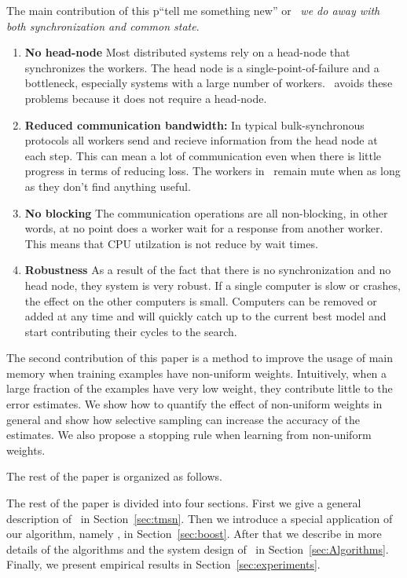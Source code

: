 The main contribution of this p``tell me something new'' or
\tmsn\ {\em we do away with both synchronization and common state}.

\begin{enumerate}
\item {\bf No head-node} Most distributed systems rely on a head-node
  that synchronizes the workers. The head node is a
  single-point-of-failure and a bottleneck, especially systems with a
  large number of workers. \tmsn\ avoids these problems because it
  does not require a head-node.
\item {\bf Reduced communication bandwidth:} In typical bulk-synchronous
  protocols all workers send and recieve information from the head
  node at each step. This can mean a lot of communication even when
  there is little progress in terms of reducing loss. The workers in
  \tmsn\ remain mute when as long as they don't find anything useful.
\item {\bf No blocking} The communication operations are all
  non-blocking, in other words, at no point does a worker wait for a
  response from another worker. This means that CPU utilzation is not
  reduce by wait times.
\item {\bf Robustness} As a result of the fact that there is no
  synchronization and no head node, they system is very robust. If a
  single computer is slow or crashes, the effect on the other
  computers is small. Computers can be removed or added at any time
  and will quickly catch up to the current best model and start
  contributing their cycles to the search.
\end{enumerate}

The second contribution of this paper is a method to improve the usage
of main memory when training examples have non-uniform
weights. Intuitively, when a large fraction of the examples have very
low weight, they contribute little to the error estimates. We show how
to quantify the effect of non-uniform weights in general and show how
selective sampling can increase the accuracy of the estimates. We also
propose a stopping rule when learning from non-uniform weights.

The rest of the paper is organized as follows.

The rest of the paper is divided into four sections.
First we give a general description of \tmsn\ in Section~\ref{sec:tmsn}.
Then we introduce a special application of our algorithm, namely \Sparrow, in Section~\ref{sec:boost}.
After that we describe in more details of the algorithms and the system design of \Sparrow\ in
Section~\ref{sec:Algorithms}.
Finally, we present empirical results in Section~\ref{sec:experiments}.

\fi
